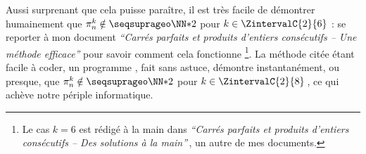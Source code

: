 \leavevmode
\smallskip

Aussi surprenant que cela puisse paraître, il est très facile de démontrer humainement que $\consprod \notin \NNssquare$ pour $k \in \ZintervalC{2}{6}$ :
se reporter à mon document \emph{\enquote{Carrés parfaits et produits d’entiers consécutifs – Une méthode efficace}} pour savoir comment cela fonctionne
\footnote{
	Le cas $k = 6$ est rédigé à la main dans \emph{\enquote{Carrés parfaits et produits d’entiers consécutifs – Des solutions à la main}}\,, un autre de mes documents.
}.
La méthode citée étant facile à coder, un programme \python, fait sans astuce, démontre instantanément, ou presque, que $\consprod \notin \NNssquare$ pour $k \in \ZintervalC{2}{8}$\,, ce qui achève notre périple informatique.